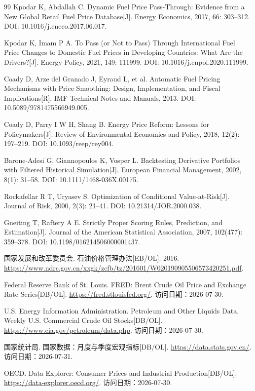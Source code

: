 \begin{thebibliography}{99}
Kpodar K, Abdallah C. Dynamic Fuel Price Pass-Through: Evidence from a New
Global Retail Fuel Price Database[J]. Energy Economics, 2017, 66: 303--312.
DOI: 10.1016/j.eneco.2017.06.017.

Kpodar K, Imam P A. To Pass (or Not to Pass) Through International Fuel Price
Changes to Domestic Fuel Prices in Developing Countries: What Are the
Drivers?[J]. Energy Policy, 2021, 149: 111999.
DOI: 10.1016/j.enpol.2020.111999.

Coady D, Arze del Granado J, Eyraud L, et al. Automatic Fuel Pricing
Mechanisms with Price Smoothing: Design, Implementation, and Fiscal
Implications[R]. IMF Technical Notes and Manuals, 2013.
DOI: 10.5089/9781475566949.005.

Coady D, Parry I W H, Shang B. Energy Price Reform: Lessons for
Policymakers[J]. Review of Environmental Economics and Policy, 2018, 12(2):
197--219. DOI: 10.1093/reep/rey004.

Barone-Adesi G, Giannopoulos K, Vosper L. Backtesting Derivative Portfolios
with Filtered Historical Simulation[J]. European Financial Management, 2002,
8(1): 31--58. DOI: 10.1111/1468-036X.00175.

Rockafellar R T, Uryasev S. Optimization of Conditional Value-at-Risk[J].
Journal of Risk, 2000, 2(3): 21--41. DOI: 10.21314/JOR.2000.038.

Gneiting T, Raftery A E. Strictly Proper Scoring Rules, Prediction, and
Estimation[J]. Journal of the American Statistical Association, 2007,
102(477): 359--378. DOI: 10.1198/016214506000001437.

国家发展和改革委员会. 石油价格管理办法[EB/OL]. 2016.
\url{https://www.ndrc.gov.cn/xxgk/zcfb/tz/201601/W020190905506573420251.pdf}.

Federal Reserve Bank of St. Louis. FRED: Brent Crude Oil Price and Exchange
Rate Series[DB/OL]. \url{https://fred.stlouisfed.org/}. 访问日期：2026-07-30.

U.S. Energy Information Administration. Petroleum and Other Liquids Data,
Weekly U.S. Commercial Crude Oil Stocks[DB/OL].
\url{https://www.eia.gov/petroleum/data.php}. 访问日期：2026-07-30.

国家统计局. 国家数据：月度与季度宏观指标[DB/OL].
\url{https://data.stats.gov.cn/}. 访问日期：2026-07-31.

OECD. Data Explorer: Consumer Prices and Industrial Production[DB/OL].
\url{https://data-explorer.oecd.org/}. 访问日期：2026-07-30.

\end{thebibliography}
